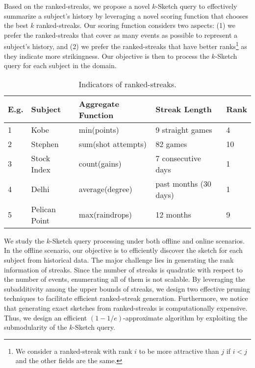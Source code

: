 Based on the ranked-streaks, we propose a novel $k$-Sketch
query to effectively summarize a subject's history by
leveraging a novel scoring function that chooses
the best $k$ ranked-streaks.
Our scoring function considers two aspects:
(1) we prefer the ranked-streaks that cover as many events as possible to represent a subject's history, and (2) we prefer the ranked-streaks that have better ranks\footnote{We consider a ranked-streak with rank $i$ to be more attractive than $j$ if $i<j$ and the other fields are the same.} as they indicate more strikingness. Our objective is then to process the $k$-Sketch query for each subject in the domain.

\begin{table}[t]
\caption{Indicators of ranked-streaks.}
\label{tbl:news-example}
\centering
\begin{tabular}{|l|l|l|l|l|}
\hline
\textbf{E.g.} & \textbf{Subject}& \textbf{Aggregate Function} & \textbf{Streak Length} & \textbf{Rank} \\
\hline
1 &  Kobe & min(points) & 9 straight games & 4 \\
\hline
2 &  Stephen & sum(shot attempts) & 82 games & 10 \\
\hline
3 &  Stock Index &count(gains) & 7 consecutive days & 1 \\
\hline
4 &  Delhi & average(degree) & past months (30 days) & 1 \\
\hline
5 &  Pelican Point & max(raindrops) & 12 months & 9 \\
\hline
\end{tabular}
\end{table}


We study the $k$-Sketch query processing under both offline and online scenarios. 
In the offline scenario, our objective is to efficiently discover the sketch for each subject 
from historical data. 
The major challenge lies in generating
the rank information of streaks. 
Since the number of streaks is quadratic with respect to the number of events, enumerating 
all of them is not scalable. By leveraging the subadditivity among the upper bounds of streaks, we design two effective pruning techniques to facilitate efficient ranked-streak generation.
Furthermore, we notice that generating exact sketches from ranked-streaks is computationally expensive. Thus, we design an efficient $(1-1/e)$-approximate algorithm by exploiting the submodularity of the $k$-Sketch query.

